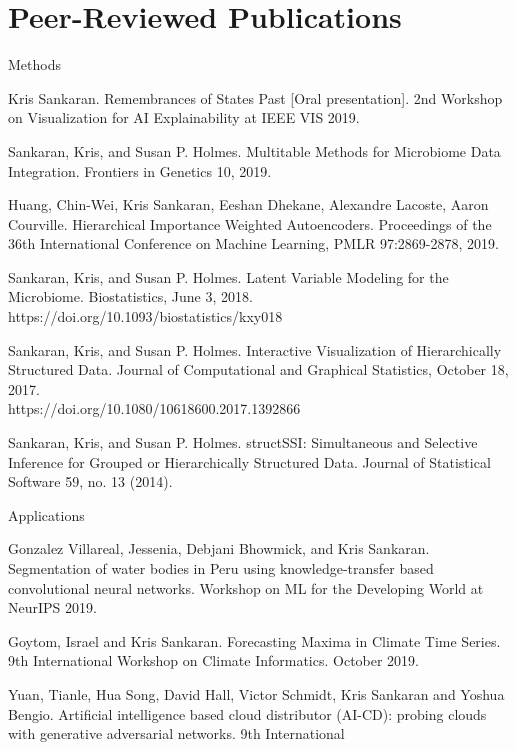 \documentclass[letterpaper]{article}
\renewenvironment{itemize}{
  \begin{list}{}{
    \setlength{\leftmargin}{1.5em}
  }
}{
  \end{list}
}
\begin{document}
\section*{Peer-Reviewed Publications}
\begin{itemize}
  \item Methods
\begin{itemize}
\item Kris Sankaran. Remembrances of States Past [Oral presentation]. 2nd Workshop on
Visualization for AI Explainability at IEEE VIS 2019. 
\item Sankaran, Kris, and Susan P. Holmes. Multitable Methods for Microbiome Data Integration. Frontiers in Genetics 10, 2019.
\item  Huang, Chin-Wei, Kris Sankaran, Eeshan Dhekane, Alexandre Lacoste, Aaron Courville. Hierarchical Importance Weighted Autoencoders.
Proceedings of the 36th International Conference on Machine Learning, PMLR 97:2869-2878, 2019.
 \item Sankaran, Kris, and Susan P. Holmes. Latent Variable Modeling for the
   Microbiome. Biostatistics, June 3, 2018.
   https://doi.org/10.1093/biostatistics/kxy018
 \item Sankaran, Kris, and Susan P. Holmes. Interactive Visualization of
   Hierarchically Structured Data. Journal of Computational and Graphical
   Statistics, October 18, 2017. \\
   https://doi.org/10.1080/10618600.2017.1392866
\item Sankaran, Kris, and Susan P. Holmes. structSSI: Simultaneous and Selective
  Inference for Grouped or Hierarchically Structured Data. Journal of
  Statistical Software 59, no. 13 (2014).
\end{itemize}
\item Applications
  \begin{itemize}
  \item Gonzalez Villareal, Jessenia, Debjani Bhowmick, and Kris Sankaran.
    Segmentation of water bodies in Peru using knowledge-transfer based
    convolutional neural networks. Workshop on ML for the Developing World at
    NeurIPS 2019.
  \item Goytom, Israel and Kris Sankaran. Forecasting Maxima in Climate Time
    Series. 9th International Workshop on Climate Informatics. October 2019.
  \item Yuan, Tianle, Hua Song, David Hall, Victor Schmidt, Kris Sankaran and
    Yoshua Bengio. Artificial intelligence based cloud distributor (AI-CD):
    probing clouds with generative adversarial networks. 9th International

\end{itemize}
\end{itemize}
\end{document}
